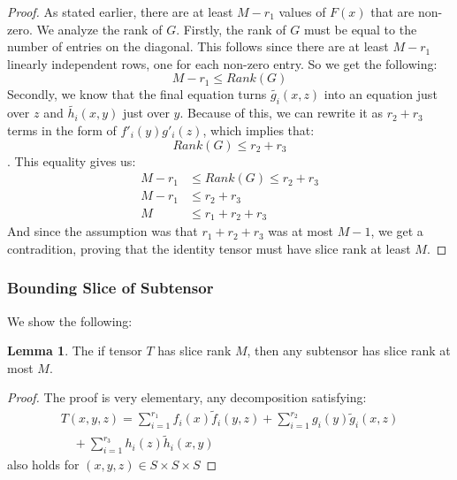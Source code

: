 \documentclass[11pt]{article}
\theoremstyle{definition}
\newtheorem{lemma}[theorem]{Lemma}
\begin{document}
\begin{proof}
\quad As stated earlier, there are at least $M-r_1$ values of $F(x)$ that are non-zero. We analyze the rank of $G$. Firstly, the rank of $G$ must be equal to the number of entries on the diagonal. This follows since there are at least $M-r_1$ linearly independent rows, one for each non-zero entry. So we get the following:
$$M-r_1 \leq Rank(G)$$
Secondly, we know that the final equation turns $\widetilde{g_i}(x,z)$ into an equation just over $z$ and $\widetilde{h_i}(x,y)$ just over $y$. Because of this, we can rewrite it as $r_2 + r_3$ terms in the form of $f'_i(y)g'_i(z)$, which implies that:
$$Rank(G) \leq r_2 + r_3$$.
This equality gives us:
\begin{align*}
    M-r_1 &\leq Rank(G) \leq r_2 + r_3\\
    M-r_1 &\leq r_2 + r_3\\
    M &\leq r_1 + r_2 + r_3
\end{align*}
And since the assumption was that $r_1 + r_2 + r_3$ was at most $M-1$, we get a contradition, proving that the identity tensor must have slice rank at least $M$.
\end{proof}
\subsubsection{Bounding Slice of Subtensor}
We show the following:
\begin{lemma}
    The if tensor $T$ has slice rank $M$, then any subtensor has slice rank at most $M$.
\end{lemma}
\begin{proof}
The proof is very elementary, any decomposition satisfying:
\begin{align*}
    T(x,y,z) = \sum_{i=1}^{r_1} f_i(x)\widetilde f_i(y,z) + \sum_{i=1}^{r_2} g_i(y)\widetilde g_i(x,z) \\
    \quad + \sum_{i=1}^{r_3} h_i(z)\widetilde h_i(x,y)
    \end{align*}
also holds for $(x,y,z) \in S \times S \times S$
\end{proof}
\end{document}
